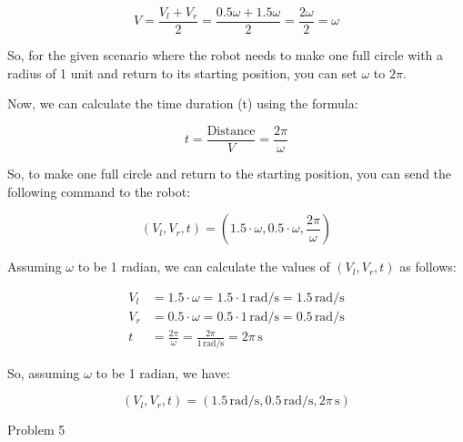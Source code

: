 \documentclass[answers]{exam}
\begin{document}
\begin{questions}
\begin{parts}
\begin{solution}
            \[V = \frac{V_l + V_r}{2} = \frac{0.5\omega + 1.5\omega}{2} = \frac{2\omega}{2} = \omega\]

            So, for the given scenario where the robot needs to make one full circle with a
            radius of 1 unit and return to its starting position, you can set \(\omega\) to
            \(2\pi\).

            Now, we can calculate the time duration (t) using the formula:

            \[t = \frac{\text{Distance}}{V} = \frac{2\pi}{\omega}\]

            So, to make one full circle and return to the starting position, you can send
            the following command to the robot:

            \[(V_l, V_r, t) = (1.5\cdot\omega, 0.5\cdot\omega, \frac{2\pi}{\omega})\]

            Assuming \(\omega\) to be 1 radian, we can calculate the values of \((V_l, V_r,
            t)\) as follows:

            \begin{align*}
                V_l & = 1.5 \cdot \omega = 1.5 \cdot 1 \, \text{rad/s} = 1.5 \, \text{rad/s}    \\
                V_r & = 0.5 \cdot \omega = 0.5 \cdot 1 \, \text{rad/s} = 0.5 \, \text{rad/s}    \\
                t   & = \frac{2\pi}{\omega} = \frac{2\pi}{1 \, \text{rad/s}} = 2\pi \, \text{s}
            \end{align*}

            So, assuming \(\omega\) to be 1 radian, we have:

            \[
                (V_l, V_r, t) = (1.5 \, \text{rad/s}, 0.5 \, \text{rad/s}, 2\pi \, \text{s})
            \]
        \end{solution}
    \end{parts}
    \question Problem 5

\end{questions}
\end{document}
